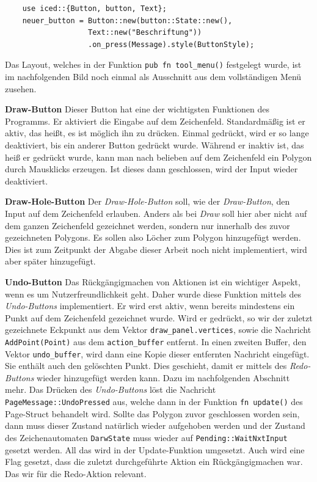 \begin{lstlisting}
    use iced::{Button, button, Text};
    neuer_button = Button::new(button::State::new(), 
                   Text::new("Beschriftung"))
                   .on_press(Message).style(ButtonStyle);
\end{lstlisting}

Das Layout, welches in der Funktion \lstinline{pub fn tool_menu()} festgelegt wurde, ist im nachfolgenden Bild noch einmal als Ausschnitt aus dem vollständigen Menü zusehen.
\linebreak

\textbf{\small{Draw-Button}}\linebreak
Dieser Button hat eine der wichtigsten Funktionen des Programms. Er aktiviert die Eingabe auf dem Zeichenfeld. Standardmäßig ist er aktiv, das heißt, es ist möglich ihn zu drücken. Einmal gedrückt, wird er so lange 
deaktiviert, bis ein anderer Button gedrückt wurde. Während er inaktiv ist, das heiß er gedrückt wurde, kann man nach belieben auf dem Zeichenfeld ein Polygon durch Mausklicks erzeugen. Ist dieses dann geschlossen, wird der 
Input wieder deaktiviert.\linebreak

\textbf{\small{Draw-Hole-Button}}\linebreak
Der \emph{Draw-Hole-Button} soll, wie der \emph{Draw-Button}, den Input auf dem Zeichenfeld erlauben. Anders als bei \emph{Draw} soll hier aber nicht auf dem ganzen Zeichenfeld
gezeichnet werden, sondern nur innerhalb des zuvor gezeichneten Polygons. Es sollen also Löcher zum Polygon hinzugefügt werden. Dies ist zum Zeitpunkt der Abgabe dieser Arbeit noch nicht implementiert, wird aber später hinzugefügt.
\linebreak

\textbf{\small{Undo-Button}}\linebreak
Das Rückgängigmachen von Aktionen ist ein wichtiger Aspekt, wenn es um Nutzerfreundlichkeit geht. Daher wurde diese Funktion mittels des \emph{Undo-Buttons} implementiert.
Er wird erst aktiv, wenn bereits mindestens ein Punkt auf dem Zeichenfeld gezeichnet wurde. Wird er gedrückt, so wir der zuletzt gezeichnete Eckpunkt aus dem Vektor \lstinline{draw_panel.vertices}, sowie die Nachricht \lstinline{AddPoint(Point)}
aus dem \lstinline{action_buffer} entfernt. In einen zweiten Buffer, den Vektor \lstinline{undo_buffer}, wird dann eine Kopie dieser entfernten Nachricht eingefügt. Sie enthält auch den gelöschten Punkt.
Dies geschieht, damit er mittels des \emph{Redo-Buttons} wieder hinzugefügt werden kann. Dazu im nachfolgenden Abschnitt mehr. Das Drücken des \emph{Undo-Buttons} löst die Nachricht 
\lstinline{PageMessage::UndoPressed} aus, welche dann in der Funktion \lstinline{fn update()} des Page-Struct behandelt wird. Sollte das Polygon zuvor geschlossen worden sein, dann muss dieser Zustand natürlich wieder aufgehoben werden und der Zustand 
des Zeichenautomaten \lstinline{DarwState} muss wieder auf \lstinline{Pending::WaitNxtInput} gesetzt werden. All das wird in der Update-Funktion umgesetzt. Auch wird eine Flag gesetzt, dass die zuletzt durchgeführte Aktion ein Rückgängigmachen war. Das wir 
für die Redo-Aktion relevant.\linebreak

